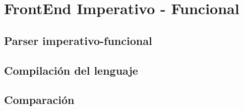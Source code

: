
\chapter{FrontEnd Imperativo - Funcional}

\section{Parser imperativo-funcional}

\section{Compilación del lenguaje}

\section{Comparación}
